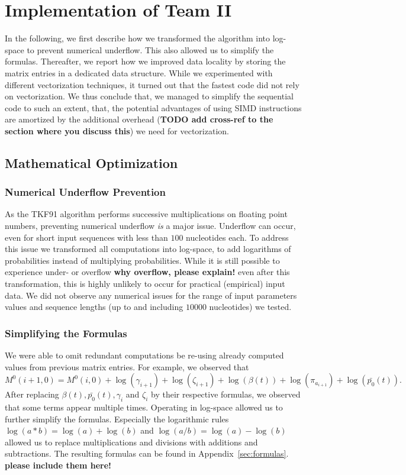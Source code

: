 \documentclass[runningheads,a4paper]{llncs}
\begin{document}
\section{Implementation of Team II}

In the following, we first describe how we transformed the algorithm into log-space to prevent numerical underflow. 
This also allowed us to simplify the formulas. 
Thereafter, we report how we improved data locality by storing the matrix entries in a dedicated data structure. 
While we experimented with different vectorization techniques, it turned out that the fastest code did not rely on vectorization. 
We thus conclude that, we managed to simplify the sequential code to such an extent, that, the potential advantages of using SIMD instructions 
are amortized by the additional overhead ({\bf TODO add cross-ref to the section where you discuss this}) we need for vectorization.

\subsection{Mathematical Optimization}

\subsubsection{Numerical Underflow Prevention}
\label{sec:log}

As the TKF91 algorithm performs successive multiplications on floating point numbers, preventing numerical underflow
{\em is} a major issue. Underflow can occur, even for short input sequences with less than $100$ nucleotides each.
To address this issue we transformed all computations into log-space, to add logarithms of probabilities instead of multiplying probabilities.
While it is still possible to experience under- or overflow {\bf why overflow, please explain!} even after this transformation, 
this is highly unlikely to occur for practical (empirical) input data.
We did not observe any numerical issues for the range of input parameters values and sequence lengths (up to and including $10000$ nucleotides) 
we tested.

\subsubsection{Simplifying the Formulas}  
We were able to omit redundant computations be re-using already computed values from previous matrix entries.
For example, we observed that $$M^0(i+1,0) = M^0(i,0) + \log(\gamma_{i+1}) + \log(\zeta_{i+1}) + \log(\beta(t)) + \log(\pi_{a_{i+1}}) + \log(\bar{p_0}(t)).$$
After replacing $\beta(t), \bar{p_0}(t), \gamma_i$ and $\zeta_i$ by their respective formulas, we observed that some terms appear multiple times. 
Operating in log-space allowed us to further simplify the formulas. Especially the logarithmic rules $\log(a*b) = \log(a) + \log(b)$ and $\log(a/b) = \log(a) - \log(b)$ 
allowed us to replace multiplications and divisions with additions and subtractions.
The resulting formulas can be found in Appendix~\ref{sec:formulas}. {\bf please include them here!}
\end{document}

